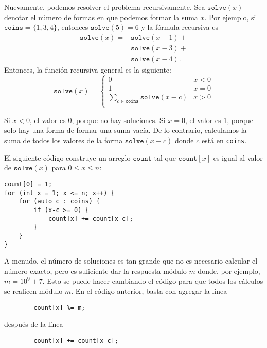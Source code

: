 Nuevamente, podemos resolver el problema recursivamente.
Sea $\texttt{solve}(x)$ denotar el número de formas
en que podemos formar la suma $x$.
Por ejemplo, si $\texttt{coins}=\{1,3,4\}$,
entonces $\texttt{solve}(5)=6$ y la fórmula recursiva es
\begin{equation*}
\begin{split}
\texttt{solve}(x) = & \texttt{solve}(x-1) + \\
                    & \texttt{solve}(x-3) + \\
                    & \texttt{solve}(x-4)  .
\end{split}
\end{equation*}
Entonces, la función recursiva general es la siguiente:
\begin{equation*}
    \texttt{solve}(x) = \begin{cases}
               0               & x < 0\\
               1               & x = 0\\
               \sum_{c \in \texttt{coins}} \texttt{solve}(x-c) & x > 0 \\
           \end{cases}
\end{equation*}

Si $x<0$, el valor es 0, porque no hay soluciones.
Si $x=0$, el valor es 1, porque solo hay una forma
de formar una suma vacía.
De lo contrario, calculamos la suma de todos los valores
de la forma $\texttt{solve}(x-c)$ donde $c$ está en \texttt{coins}.

El siguiente código construye un arreglo
$\texttt{count}$ tal que
$\texttt{count}[x]$ es igual
al valor de $\texttt{solve}(x)$
para $0 \le x \le n$:

\begin{lstlisting}
count[0] = 1;
for (int x = 1; x <= n; x++) {
    for (auto c : coins) {
        if (x-c >= 0) {
            count[x] += count[x-c];
        }
    }
}
\end{lstlisting}

A menudo, el número de soluciones es tan grande
que no es necesario calcular el número exacto,
pero es suficiente dar la respuesta módulo $m$
donde, por ejemplo, $m=10^9+7$.
Esto se puede hacer cambiando el código para que
todos los cálculos se realicen módulo $m$.
En el código anterior, basta con agregar la línea
\begin{lstlisting}
        count[x] %= m;
\end{lstlisting}
después de la línea
\begin{lstlisting}
        count[x] += count[x-c];
\end{lstlisting}

